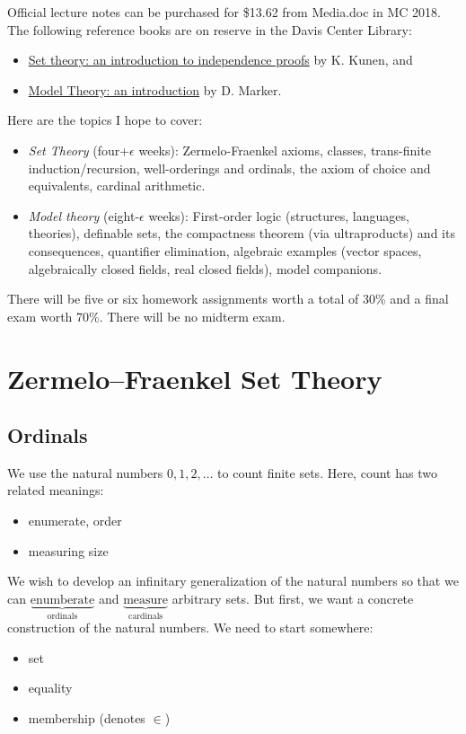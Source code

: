 \documentclass[11pt]{article}
\begin{document}
\begin{titlepage}
Official lecture notes can be purchased for \$13.62 from Media.doc in MC 2018.
The following reference books are on reserve in the Davis Center Library:
\begin{itemize}
	\item \underline{Set theory: an introduction to independence proofs} by
		K. Kunen, and
	\item \underline{Model Theory: an introduction} by D. Marker.
\end{itemize}
Here are the topics I hope to cover:
\begin{itemize}
	\item {\it Set Theory} (four+$\epsilon$ weeks): Zermelo-Fraenkel axioms,
		classes, trans-finite induction/recursion, well-orderings and ordinals,
		the axiom of choice and equivalents, cardinal arithmetic.
	\item {\it Model theory} (eight-$\epsilon$ weeks): First-order logic
		(structures, languages, theories), definable sets, the compactness
		theorem (via ultraproducts) and its consequences, quantifier
		elimination, algebraic examples (vector spaces, algebraically closed
		fields, real closed fields), model companions.
\end{itemize}
There will be five or six homework assignments worth a total of 30\% and a final
exam worth 70\%. There will be no midterm exam.

\pagebreak
\section{Zermelo–Fraenkel Set Theory}
\subsection{Ordinals}
We use the natural numbers $0,1,2,\dots$ to count finite sets. Here, count has
two related meanings:

\begin{itemize}
	\item enumerate, order
	\item measuring size
\end{itemize}

We wish to develop an infinitary generalization of the natural numbers so that
we can $\underbrace{\text{enumberate}}_{\text{ordinals}}$ and
$\underbrace{\text{measure}}_{\text{cardinals}}$ arbitrary sets. But first, we
want a concrete construction of the natural numbers. We need to start somewhere:

\begin{itemize}
	\item set
	\item equality
	\item membership (denotes $\in$)
\end{itemize}


\end{titlepage}
\end{document}
